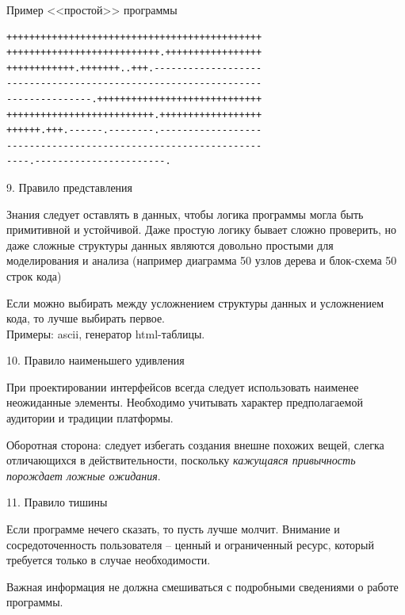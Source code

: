 \begin{frame}[fragile]{Пример <<простой>> программы}
	\begin{center}
		\begin{verbatim}
+++++++++++++++++++++++++++++++++++++++++++++
+++++++++++++++++++++++++++.+++++++++++++++++
++++++++++++.+++++++..+++.-------------------
---------------------------------------------
---------------.+++++++++++++++++++++++++++++
++++++++++++++++++++++++++.++++++++++++++++++
++++++.+++.------.--------.------------------
---------------------------------------------
----.-----------------------.
		\end{verbatim}
	\end{center}
\end{frame}

\begin{frame}{9. Правило представления}
	\begin{block}{Знания следует оставлять в данных,  чтобы логика программы могла быть примитивной и устойчивой.}
		\pause
		Даже простую логику бывает сложно проверить,  но даже сложные структуры данных являются довольно простыми для моделирования и анализа (например диаграмма 50 узлов дерева и блок-схема 50 строк кода)
	\end{block}
	\pause
	Если можно выбирать между усложнением структуры данных и усложнением кода,  то лучше выбирать первое.\\
	Примеры: ascii,  генератор html-таблицы.
\end{frame}

\begin{frame}{10. Правило наименьшего удивления}
	\begin{block}{При проектировании интерфейсов всегда следует использовать наименее неожиданные элементы.}
		\pause
		Необходимо учитывать характер предполагаемой аудитории и традиции платформы.
	\end{block}
	\pause
	Оборотная сторона: следует избегать создания внешне похожих вещей,  слегка отличающихся в действительности,  поскольку {\itshape кажущаяся привычность порождает ложные ожидания}.
\end{frame}

\begin{frame}{11. Правило тишины}
	\begin{block}{Если программе нечего сказать,  то пусть лучше молчит.}
		\pause
		Внимание и сосредоточенность пользователя -- ценный и ограниченный ресурс,  который требуется только в случае необходимости.
	\end{block}
	\pause
	Важная информация не должна смешиваться с подробными сведениями о работе программы.
\end{frame}

